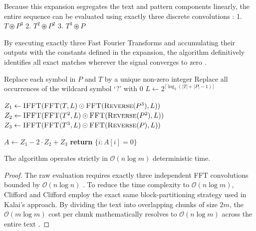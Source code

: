 Because this expansion segregates the text and pattern components linearly, the entire sequence can be evaluated using exactly three discrete convolutions \cite{clifford2007}:
1. $T \circledast P^3$
2. $T^2 \circledast P^2$
3. $T^3 \circledast P$

By executing exactly three Fast Fourier Transforms and accumulating their outputs with the constants defined in the expansion, the algorithm definitively identifies all exact matches wherever the signal converges to zero \cite{clifford2007}.

\begin{algorithm}[H]
\caption{Clifford-Clifford Exact Matching \cite{clifford2007}}
\begin{algorithmic}[1]
    \State Replace each symbol in $P$ and $T$ by a unique non-zero integer
    \State Replace all occurrences of the wildcard symbol `?' with 0
    \State $L \gets 2^{\lceil \log_2(|T| + |P| - 1) \rceil}$
    
    \State $Z_1 \gets \text{\textsc{IFFT}}(\text{\textsc{FFT}}(T, L) \odot \text{\textsc{FFT}}(\text{\textsc{Reverse}}(P^3), L))$
    \State $Z_2 \gets \text{\textsc{IFFT}}(\text{\textsc{FFT}}(T^2, L) \odot \text{\textsc{FFT}}(\text{\textsc{Reverse}}(P^2), L))$
    \State $Z_3 \gets \text{\textsc{IFFT}}(\text{\textsc{FFT}}(T^3, L) \odot \text{\textsc{FFT}}(\text{\textsc{Reverse}}(P), L))$
    
    \State $A \gets Z_1 - 2 \cdot Z_2 + Z_3$
    \State \textbf{return} $\{i \colon A[i] = 0\}$
\EndFunction
\end{algorithmic}
\end{algorithm}

\begin{theorem}
The algorithm operates strictly in $\mathcal{O}(n \log m)$ deterministic time.
\end{theorem}

\begin{proof}
The raw evaluation requires exactly three independent FFT convolutions bounded by $\mathcal{O}(n \log n)$ \cite{clifford2007}. To reduce the time complexity to $\mathcal{O}(n \log m)$, Clifford and Clifford employ the exact same block-partitioning strategy used in Kalai's approach. By dividing the text into overlapping chunks of size $2m$, the $\mathcal{O}(m \log m)$ cost per chunk mathematically resolves to $\mathcal{O}(n \log m)$ across the entire text \cite{clifford2007}.
\end{proof}